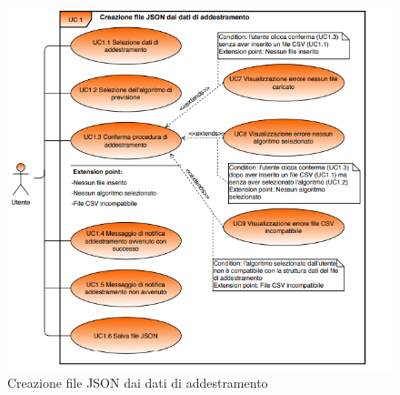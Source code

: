 	\begin{figure}[H]
		\centering
		\includegraphics[scale=0.70]{../Analisi_dei_requisiti/img/Diagrammi_UML/UC1_tool_di_addestramento.png}
		\caption{Creazione file JSON dai dati di addestramento}
	\end{figure}	


